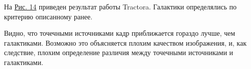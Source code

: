 \documentclass[12pt,a4paper]{article}
\begin{document}
 На \hyperref[pic14]{Рис. 14} приведен результат работы Tractora. Галактики определялись по критерию описанному ранее.

Видно, что точечными источниками кадр приближается гораздо лучше, чем галактиками. Возможно это объясняется плохим качеством изображения, и, как следствие, плохим определение различия между точечными источниками и галактиками. 

\begin{figure}
    \begin{minipage}{0.45\textwidth}
    \end{minipage} 
    \hfill
    \begin{minipage}{0.45\textwidth}

\end{minipage}
\end{figure}
\end{document}
